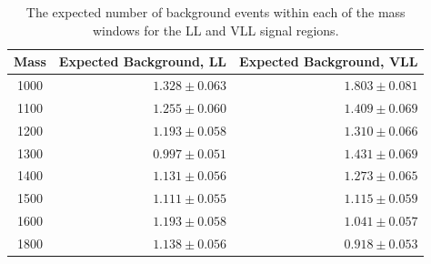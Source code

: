 \begin{table}
\centering
\begin{tabular}{crr}
  \hline
  Mass & Expected Background, \acs*{LL} & Expected Background, \acs*{VLL} \\
  \hline
  1000 & $1.328 \pm 0.063 $ & $1.803 \pm 0.081 $ \\
  1100 & $1.255 \pm 0.060 $ & $1.409 \pm 0.069 $ \\
  1200 & $1.193 \pm 0.058 $ & $1.310 \pm 0.066 $ \\
  1300 & $0.997 \pm 0.051 $ & $1.431 \pm 0.069 $ \\
  1400 & $1.131 \pm 0.056 $ & $1.273 \pm 0.065 $ \\
  1500 & $1.111 \pm 0.055 $ & $1.115 \pm 0.059 $ \\
  1600 & $1.193 \pm 0.058 $ & $1.041 \pm 0.057 $ \\
  1800 & $1.138 \pm 0.056 $ & $0.918 \pm 0.053 $ \\
  \hline
\end{tabular}
\caption{The expected number of background events within each of the mass windows for the \acs*{LL} and \acs*{VLL} signal regions.}
\label{tab:background_yields}
\end{table}

